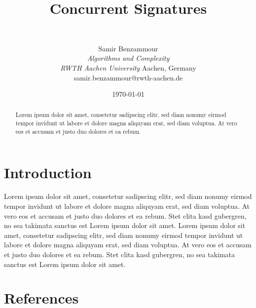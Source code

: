 \documentclass[final]{IEEEtran}%
\title{Concurrent Signatures}
\author{\IEEEauthorblockN{Samir Benzammour}\\
    \IEEEauthorblockA{\textit{Algorithms and Complexity} \\
    \textit{RWTH Aachen University}\\
    Aachen, Germany \\
    samir.benzammour@rwth-aachen.de}
  }
\author{Samir Benzammour\\
    \textit{Algorithms and Complexity}\\
    \textit{RWTH Aachen University}
    Aachen, Germany \\
    samir.benzammour@rwth-aachen.de
  }
\date{\today}
\begin{document}
\maketitle


\begin{abstract}
Lorem ipsum dolor sit amet, consetetur sadipscing elitr, sed diam nonumy eirmod tempor invidunt ut labore et dolore magna aliquyam erat, sed diam voluptua. At vero eos et accusam et justo duo dolores et ea rebum.
\end{abstract}

\section{Introduction}
Lorem ipsum dolor sit amet, consetetur sadipscing elitr, sed diam nonumy eirmod tempor invidunt ut labore et dolore magna aliquyam erat, sed diam voluptua. At vero eos et accusam et justo duo dolores et ea rebum. Stet clita kasd gubergren, no sea takimata sanctus est Lorem ipsum dolor sit amet. Lorem ipsum dolor sit amet, consetetur sadipscing elitr, sed diam nonumy eirmod tempor invidunt ut labore et dolore magna aliquyam erat, sed diam voluptua. At vero eos et accusam et justo duo dolores et ea rebum. Stet clita kasd gubergren, no sea takimata sanctus est Lorem ipsum dolor sit amet.

\section*{References}



\end{document}
